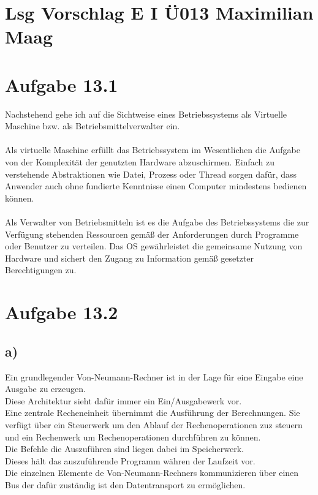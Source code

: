 \documentclass{article}
\begin{document}
	\section*{Lsg Vorschlag E I Ü013 Maximilian Maag}
	\section*{Aufgabe 13.1}
	Nachstehend gehe ich auf die Sichtweise eines Betriebssystems als Virtuelle Maschine bzw. als Betriebsmittelverwalter ein. \\ \\
	Als virtuelle Maschine erfüllt das Betriebssystem im Wesentlichen die Aufgabe von der Komplexität der genutzten Hardware abzuschirmen. Einfach zu verstehende Abstraktionen wie Datei, Prozess oder Thread sorgen dafür, dass Anwender auch ohne fundierte Kenntnisse einen Computer mindestens bedienen können. \\ \\
	Als Verwalter von Betriebsmitteln ist es die Aufgabe des Betriebssystems die zur Verfügung stehenden Ressourcen gemäß der Anforderungen durch Programme oder Benutzer zu verteilen. Das OS gewährleistet die gemeinsame Nutzung von Hardware und sichert den  Zugang zu Information gemäß gesetzter Berechtigungen zu.
	
	\section*{Aufgabe 13.2}
	\subsection*{a)}
	Ein grundlegender Von-Neumann-Rechner ist in der Lage für eine Eingabe eine Ausgabe zu erzeugen. \\
	Diese Architektur sieht dafür immer ein Ein/Ausgabewerk vor. \\
	Eine zentrale Recheneinheit übernimmt die Ausführung der Berechnungen. Sie verfügt über ein Steuerwerk um den Ablauf der Rechenoperationen zuz steuern und ein Rechenwerk um Rechenoperationen durchführen zu können. \\
	Die Befehle die Auszuführen sind liegen dabei im Speicherwerk. \\
	Dieses hält das auszuführende Programm währen der Laufzeit vor. \\
	Die einzelnen Elemente de Von-Neumann-Rechners kommunizieren über einen Bus der dafür zuständig ist den Datentransport zu ermöglichen.
\end{document}
